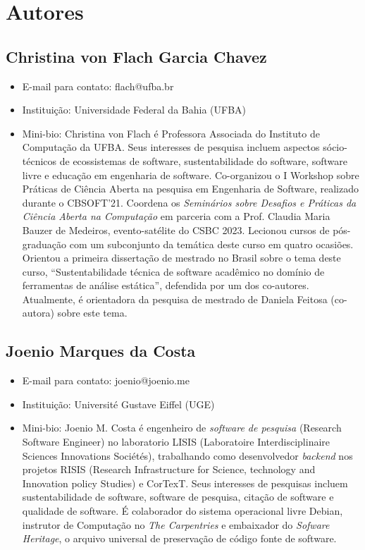 \section{Autores}
\subsection*{Christina von Flach Garcia Chavez}
    \begin{itemize}
        \item E-mail para contato: flach@ufba.br
        \item Instituição: Universidade Federal da Bahia (UFBA)
        \item Mini-bio: Christina von Flach é Professora Associada do Instituto de Computação da UFBA. Seus interesses de pesquisa incluem aspectos sócio-técnicos de ecossistemas de software, sustentabilidade do software, software livre e educação em engenharia de software. Co-organizou o I Workshop sobre Práticas de Ciência Aberta na pesquisa em Engenharia de Software, realizado durante o CBSOFT'21. Coordena os \textit{Seminários sobre Desafios e Práticas da Ciência Aberta na Computação} em parceria com a Prof. Claudia Maria Bauzer de Medeiros, evento-satélite do CSBC 2023. Lecionou cursos de pós-graduação com um subconjunto da temática deste curso em quatro ocasiões. Orientou a primeira dissertação de mestrado no Brasil sobre o tema deste curso, ``Sustentabilidade técnica de software acadêmico no domínio de ferramentas de análise estática'', defendida por um dos co-autores. Atualmente, é orientadora da pesquisa de mestrado de Daniela Feitosa (co-autora) sobre este tema.
        \end{itemize}

\subsection*{Joenio Marques da Costa}
    \begin{itemize}
        \item E-mail para contato: joenio@joenio.me
        \item Instituição: Université Gustave Eiffel (UGE)
        \item Mini-bio: Joenio M. Costa é engenheiro de \textit{software de pesquisa} (Research Software Engineer) no laboratorio LISIS (Laboratoire Interdisciplinaire Sciences Innovations Sociétés), trabalhando como desenvolvedor \textit{backend} nos projetos RISIS (Research Infrastructure for Science, technology and Innovation policy Studies) e CorTexT. Seus interesses de pesquisas incluem sustentabilidade de software, software de pesquisa, citação de software e qualidade de software. É colaborador do sistema operacional livre Debian, instrutor de Computação no \textit{The Carpentries} e embaixador do \textit{Sofware Heritage}, o arquivo universal de preservação de código fonte de software.
    \end{itemize}

